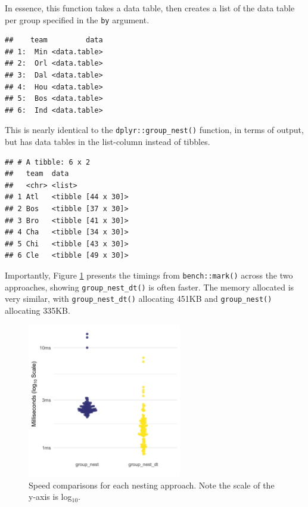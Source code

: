 \documentclass[doc,floatsintext]{apa6}
\newenvironment{Shaded}{\begin{snugshade}}{\end{snugshade}}
\newcommand{\KeywordTok}[1]{\textcolor[rgb]{0.13,0.29,0.53}{\textbf{#1}}}
\newcommand{\NormalTok}[1]{#1}
\newcommand{\OperatorTok}[1]{\textcolor[rgb]{0.81,0.36,0.00}{\textbf{#1}}}
\newcommand{\StringTok}[1]{\textcolor[rgb]{0.31,0.60,0.02}{#1}}
\begin{document}
In essence, this function takes a data table, then creates a list of the data table per group specified in the \texttt{by} argument.

\begin{Shaded}
\end{Shaded}

\begin{verbatim}
##    team         data
## 1:  Min <data.table>
## 2:  Orl <data.table>
## 3:  Dal <data.table>
## 4:  Hou <data.table>
## 5:  Bos <data.table>
## 6:  Ind <data.table>
\end{verbatim}

This is nearly identical to the \texttt{dplyr::group\_nest()} function, in terms of output, but has data tables in the list-column instead of tibbles.

\begin{Shaded}
\end{Shaded}

\begin{verbatim}
## # A tibble: 6 x 2
##   team  data              
##   <chr> <list>            
## 1 Atl   <tibble [44 x 30]>
## 2 Bos   <tibble [37 x 30]>
## 3 Bro   <tibble [41 x 30]>
## 4 Cha   <tibble [34 x 30]>
## 5 Chi   <tibble [43 x 30]>
## 6 Cle   <tibble [49 x 30]>
\end{verbatim}

Importantly, Figure \ref{speed} presents the timings from \texttt{bench::mark()} across the two approaches, showing \texttt{group\_nest\_dt()} is often faster. The memory allocated is very similar, with \texttt{group\_nest\_dt()} allocating 451KB and \texttt{group\_nest()} allocating 335KB.

\begin{figure}[tb]
  \centering
  \includegraphics[width=0.6\textwidth]{timings_manuscript.png}
  \caption{Speed comparisons for each nesting approach. Note the scale of the y-axis is log$_{10}$.}
  \label{speed}
\end{figure}
\end{document}

